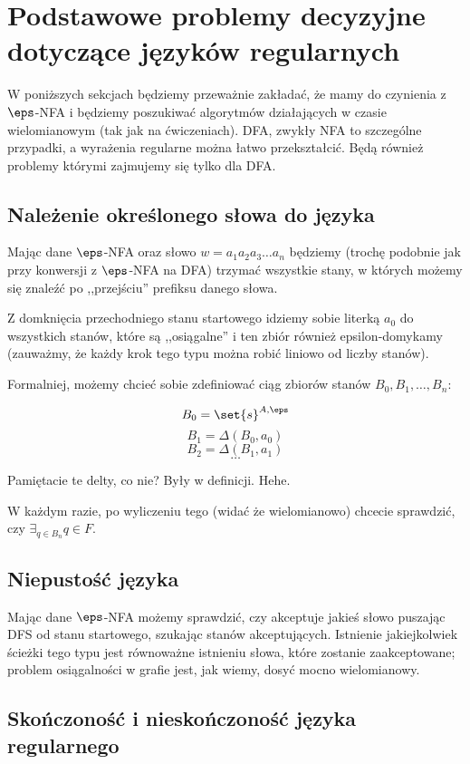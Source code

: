 \section{Podstawowe problemy decyzyjne dotyczące języków regularnych}

W poniższych sekcjach będziemy przeważnie zakładać, że mamy do czynienia z \( \eps\)-NFA i będziemy poszukiwać algorytmów działających w czasie wielomianowym (tak jak na ćwiczeniach). DFA, zwykły NFA to szczególne przypadki, a wyrażenia regularne można łatwo przekształcić. Będą również problemy którymi zajmujemy się tylko dla DFA.

\subsection{Należenie określonego słowa do języka}

Mając dane \(\eps\)-NFA oraz słowo \(w = a_1a_2a_3\dots a_n\) będziemy (trochę podobnie jak przy konwersji z \(\eps\)-NFA na DFA) trzymać wszystkie stany, w których możemy się znaleźć po ,,przejściu'' prefiksu danego słowa.

Z domknięcia przechodniego stanu startowego idziemy sobie literką \(a_0\) do wszystkich stanów, które są ,,osiągalne'' i ten zbiór również epsilon-domykamy (zauważmy, że każdy krok tego typu można robić liniowo od liczby stanów). 

Formalniej, możemy chcieć sobie zdefiniować ciąg zbiorów stanów \(B_{0}, B_{1}, \dots, B_{n} \):

\[ 
B_{0} = \set{s}^{A, \eps}
\]
\[
B_1 = \Delta(B_0, a_0) 
\]
\[
B_2 = \Delta(B_1, a_1)
\]
\[ 
\dots 
\]

Pamiętacie te delty, co nie? Były w definicji. Hehe. 

W każdym razie, po wyliczeniu tego (widać że wielomianowo) chcecie sprawdzić, czy \( \exists_{q \in B_n} q \in F \).

\subsection{Niepustość języka}

Mając dane \(\eps\)-NFA możemy sprawdzić, czy akceptuje jakieś słowo puszając DFS od stanu startowego, szukając stanów akceptujących. Istnienie jakiejkolwiek ścieżki tego typu jest równoważne istnieniu słowa, które zostanie zaakceptowane; problem osiągalności w grafie jest, jak wiemy, dosyć mocno wielomianowy. 

\subsection{Skończoność i nieskończoność języka regularnego}

